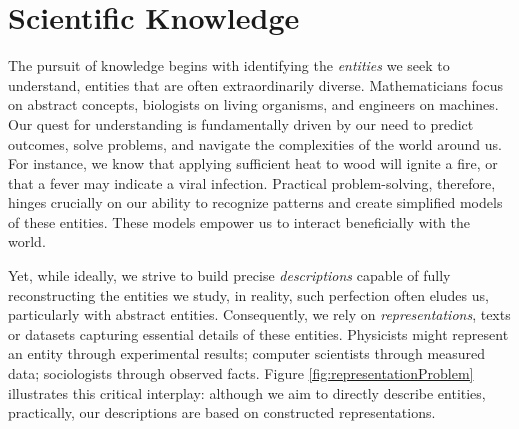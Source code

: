 %
%

\section{Scientific Knowledge}

The pursuit of knowledge begins with identifying the \emph{entities} we seek to understand, entities that are often extraordinarily diverse. Mathematicians focus on abstract concepts, biologists on living organisms, and engineers on machines. Our quest for understanding is fundamentally driven by our need to predict outcomes, solve problems, and navigate the complexities of the world around us. For instance, we know that applying sufficient heat to wood will ignite a fire, or that a fever may indicate a viral infection. Practical problem-solving, therefore, hinges crucially on our ability to recognize patterns and create simplified models of these entities. These models empower us to interact beneficially with the world.

Yet, while ideally, we strive to build precise \emph{descriptions} capable of fully reconstructing the entities we study, in reality, such perfection often eludes us, particularly with abstract entities. Consequently, we rely on \emph{representations}, texts or datasets capturing essential details of these entities. Physicists might represent an entity through experimental results; computer scientists through measured data; sociologists through observed facts. Figure \ref{fig:representationProblem} illustrates this critical interplay: although we aim to directly describe entities, practically, our descriptions are based on constructed representations.

% 

